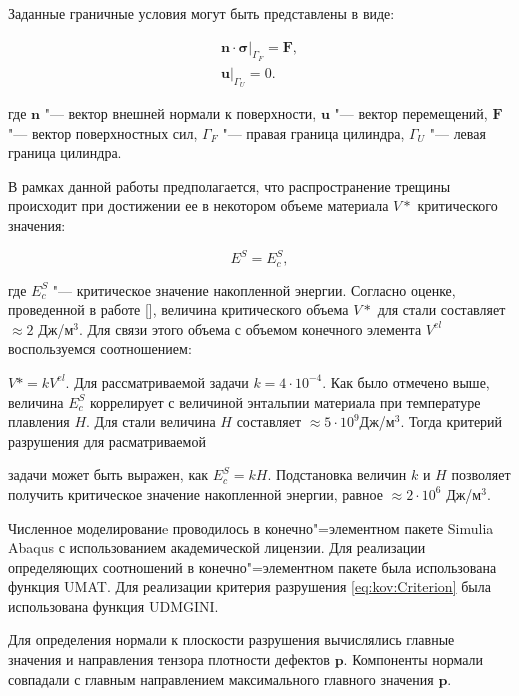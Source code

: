Заданные граничные условия могут быть представлены в виде:

\begin{gather*}

\boldsymbol{n}\cdot\boldsymbol{\sigma}\Big|_{\Gamma_{F}}=\boldsymbol{F},\\

\boldsymbol{u}\Big|_{\Gamma_{U}}=0.

\end{gather*}

где  $\boldsymbol{n}$ "--- вектор внешней нормали к поверхности, $\boldsymbol{u}$ "--- вектор перемещений, $\boldsymbol{F}$ "--- вектор поверхностных сил, $\Gamma_{F}$ "---  правая граница цилиндра, $\Gamma_{U}$ "--- левая граница цилиндра.

В рамках данной работы предполагается, что распространение трещины происходит при достижении ее в некотором объеме материала $V*$ критического значения:

\begin{equation}

E^{S}=E^{S}_{c}, \label{eq:kov:Criterion}

\end{equation}

где $E^{S}_{c}$ "--- критическое значение накопленной энергии. Согласно оценке, проведенной в работе [],  величина критического объема $V*$ для стали составляет $\approx 2$ Дж/м$^3$. Для связи этого объема с объемом конечного элемента $V^{el}$ воспользуемся соотношением:

$V*=kV^{el}$. Для рассматриваемой задачи $k=4\cdot10^{-4}$. Как было отмечено выше, величина $E^{S}_{c}$ коррелирует с величиной энтальпии материала при температуре плавления $H$. Для стали величина $H$ составляет $\approx 5\cdot10^{9}$Дж/м$^3$. Тогда критерий разрушения для расматриваемой

задачи может быть выражен, как $E^{S}_{c}=kH$. Подстановка величин $k$ и $H$ позволяет получить критическое значение накопленной энергии, равное $\approx2\cdot10^6$ Дж/м$^{3}$.



Численное моделированиe   проводилось в конечно"=элементном пакете Si\-mu\-lia Abaqus с использованием академической лицензии. Для реализации определяющих соотношений в конечно"=элементном пакете была использована функция UMAT.  Для реализации критерия разрушения \eqref{eq:kov:Criterion} была использована функция UDMGINI.

Для определения нормали к плоскости разрушения вычислялись главные значения и направления тензора плотности дефектов $\boldsymbol{p}$. Компоненты нормали совпадали с главным направлением максимального главного значения  $\boldsymbol{p}$.

